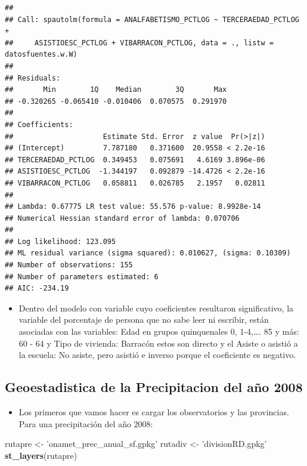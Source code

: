 \documentclass[11pt,]{article}
\newenvironment{Shaded}{\begin{snugshade}}{\end{snugshade}}
\newcommand{\KeywordTok}[1]{\textcolor[rgb]{0.13,0.29,0.53}{\textbf{#1}}}
\newcommand{\StringTok}[1]{\textcolor[rgb]{0.31,0.60,0.02}{#1}}
\newcommand{\NormalTok}[1]{#1}
\providecommand{\tightlist}{%
\setlength{\itemsep}{0pt}\setlength{\parskip}{0pt}}
\begin{document}
\begin{verbatim}
## 
## Call: spautolm(formula = ANALFABETISMO_PCTLOG ~ TERCERAEDAD_PCTLOG + 
##     ASISTIOESC_PCTLOG + VIBARRACON_PCTLOG, data = ., listw = datosfuentes.w.W)
## 
## Residuals:
##       Min        1Q    Median        3Q       Max 
## -0.320265 -0.065410 -0.010406  0.070575  0.291970 
## 
## Coefficients: 
##                     Estimate Std. Error  z value  Pr(>|z|)
## (Intercept)         7.787180   0.371600  20.9558 < 2.2e-16
## TERCERAEDAD_PCTLOG  0.349453   0.075691   4.6169 3.896e-06
## ASISTIOESC_PCTLOG  -1.344197   0.092879 -14.4726 < 2.2e-16
## VIBARRACON_PCTLOG   0.058811   0.026785   2.1957   0.02811
## 
## Lambda: 0.67775 LR test value: 55.576 p-value: 8.9928e-14 
## Numerical Hessian standard error of lambda: 0.070706 
## 
## Log likelihood: 123.095 
## ML residual variance (sigma squared): 0.010627, (sigma: 0.10309)
## Number of observations: 155 
## Number of parameters estimated: 6 
## AIC: -234.19
\end{verbatim}

\begin{itemize}
\tightlist
\item
  Dentro del modelo con variable cuyo coeficientes resultaron
  significativo, la variable del porcentaje de persona que no sabe leer
  ni escribir, están asociadas con las variables: Edad en grupos
  quinquenales 0, 1-4,\ldots{}. 85 y más: 60 - 64 y Tipo de vivienda:
  Barracón estos son directo y el Asiste o asistió a la escuela: No
  asiste, pero asistió e inverso porque el coeficiente es negativo.
\end{itemize}

\subsection{Geoestadistica de la Precipitacion del año
2008}\label{geoestadistica-de-la-precipitacion-del-auxf1o-2008-1}

\begin{itemize}
\tightlist
\item
  Los primeros que vamos hacer es cargar los observatorios y las
  provincias. Para una precipitación del año 2008:
\end{itemize}

\begin{Shaded}
\begin{Highlighting}[]
\NormalTok{rutapre <-}\StringTok{ 'onamet_prec_anual_sf.gpkg'}
\NormalTok{rutadiv <-}\StringTok{ 'divisionRD.gpkg'}
\KeywordTok{st_layers}\NormalTok{(rutapre)}
\end{Highlighting}
\end{Shaded}
\end{document}
